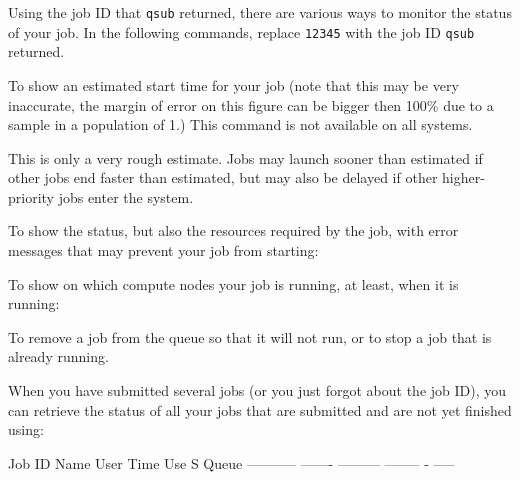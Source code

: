 Using the job ID that \lstinline|qsub| returned, there are various ways to monitor
the status of your job. In the following commands, replace \lstinline|12345|
with the job ID \lstinline|qsub| returned.



\begin{prompt}
\end{prompt}

\ifgent
\else
\ifbrussel
\else
  To show an estimated start time for your job (note that this may be very inaccurate,
  the margin of error on this figure can be bigger then 100\% due to a sample in a
  population of 1.)
  This command is not available on all systems.

\begin{prompt}
\end{prompt}

  This is only a very rough estimate. Jobs may launch sooner than estimated if
  other jobs end faster than estimated, but may also be delayed if other
  higher-priority jobs enter the system.

  To show the status, but also the resources required by the job, with error
  messages that may prevent your job from starting:

\begin{prompt}
\end{prompt}
\fi
\fi

To show on which compute nodes your job is running, at least, when it is
running:

\begin{prompt}
\end{prompt}

To remove a job from the queue so that it will not run, or to stop a job that
is already running.

\begin{prompt}
\end{prompt}

When you have submitted several jobs (or you just forgot about the job ID), you
can retrieve the status of all your jobs that are submitted and are not yet
finished using:

\begin{prompt}
Job ID      Name    User      Time Use S Queue
----------- ------- --------- -------- - -----
\end{prompt}

